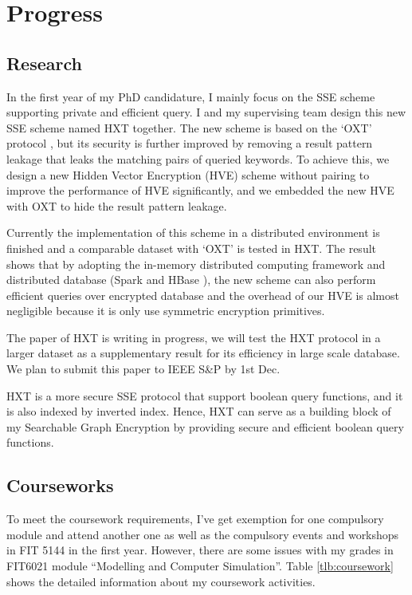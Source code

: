 \chapter{Progress}
\section{Research}
In the first year of my PhD candidature, I mainly focus on the SSE scheme supporting private and efficient query. I and my supervising team design this new SSE scheme named HXT together. The new scheme is based on the `OXT' protocol \cite{cash2013highly}, but its security is further improved by removing a result pattern leakage that leaks the matching pairs of queried keywords. To achieve this, we design a new Hidden Vector Encryption (HVE) scheme without pairing to improve the performance of HVE significantly, and we embedded the new HVE with OXT to hide the result pattern leakage.

Currently the implementation of this scheme in a distributed environment is finished and a comparable dataset with `OXT' is tested in HXT. The result shows that by adopting the in-memory distributed computing framework and distributed database (Spark \cite{apache2017spark} and HBase \cite{apache2017hbase}), the new scheme can also perform efficient queries over encrypted database and the overhead of our HVE is almost negligible because it is only use symmetric encryption primitives. 

The paper of HXT is writing in progress, we will test the HXT protocol in a larger dataset as a supplementary result for its efficiency in large scale database. We plan to submit this paper to IEEE S\&P by 1st Dec.

HXT is a more secure SSE protocol that support boolean query functions, and it is also indexed by inverted index. Hence, HXT can serve as a building block of my Searchable Graph Encryption by providing secure and efficient boolean query functions.

\section{Courseworks}
To meet the coursework requirements, I've get exemption for one compulsory module and attend another one as well as the compulsory events and workshops in FIT 5144 in the first year. However, there are some issues with my grades in FIT6021 module ``Modelling and Computer Simulation''. Table \ref{tlb:coursework} shows the detailed information about my coursework activities. 

